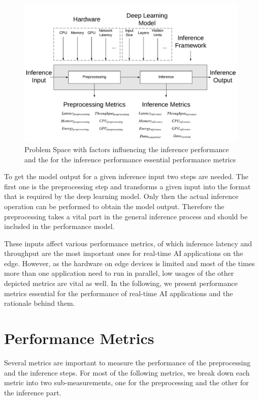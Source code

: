 \begin{figure}[!htb]
\centering
\includegraphics[width=0.99\textwidth]{./Bilder/PerformanceModel.pdf}
\caption{Problem Space with factors influencing the inference performance and the for the inference performance essential performance metrics}
\label{fig:perfmodel}
\end{figure}

To get the model output for a given inference input two steps are needed. The first one is the preprocessing step and transforms a given input into the format that is required by the deep learning model. Only then the actual inference operation can be performed to obtain the model output. Therefore the preprocessing takes a vital part in the general inference process and should be included in the performance model.

These inputs affect various performance metrics, of which inference latency and throughput are the most important ones for real-time AI applications on the edge. However, as the hardware on edge devices is limited and most of the times more than one application need to run in parallel, low usages of the other depicted metrics are vital as well.
In the following, we present performance metrics essential for the performance of real-time AI applications and the rationale behind them.







\section{Performance Metrics}
\label{chap:metrics}
Several metrics are important to measure the performance of the preprocessing and the inference steps. For most of the following metrics, we break down each metric into two sub-measurements, one for the preprocessing and the other for the inference part.

